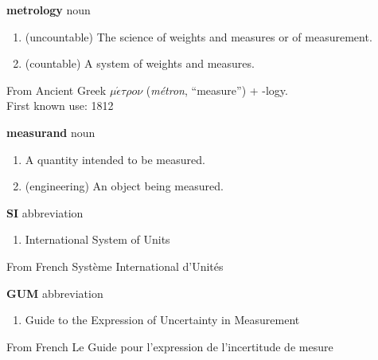 \documentclass[
    DIV=12,
    BCOR=0mm,
    pagenumber=off,
    paper=11in:8.5in,
    pagesize,
]{scrartcl}
\begin{document}
\pagestyle{empty}
\fontsize{32}{36}\selectfont
\raggedright


\hfill\vfill
\begin{minipage}{\linewidth}
    \textbf{metrology}
     noun
    \begin{enumerate}
        \item (uncountable) The science of weights and measures or of measurement.
        \item (countable) A system of weights and measures.
    \end{enumerate}
    From Ancient Greek $\mu\acute{\epsilon}\tau\rho{}o\nu$
        (\emph{m\'{e}tron}, ``measure'') + -logy. \\
    \noindent First known use: 1812
\end{minipage}
\vfill
\newpage


\hfill\vfill
\begin{minipage}{\linewidth}
    \textbf{measurand}
     noun
    \begin{enumerate}
        \item A quantity intended to be measured.
        \item (engineering) An object being measured.
    \end{enumerate}
\end{minipage}
\vfill
\newpage


\hfill\vfill
\begin{minipage}{\linewidth}
    \textbf{SI}
     abbreviation
    \begin{enumerate}
        \item International System of Units
    \end{enumerate}
    From French Syst\`{e}me International d'Unit\'{e}s
\end{minipage}
\vfill
\newpage


\hfill\vfill
\begin{minipage}{\linewidth}
    \textbf{GUM}
     abbreviation
    \begin{enumerate}
        \item Guide to the Expression of Uncertainty in Measurement
    \end{enumerate}
    From French Le Guide pour l'expression de l'incertitude de mesure
\end{minipage}
\vfill
\newpage
\end{document}
